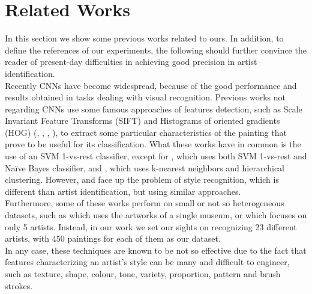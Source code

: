 \documentclass{article}
\begin{document}
\section{Related Works}\label{relwor}

In this section we show some previous works related to ours. In addition, to define the references of our experiments, the following should further convince the reader of present-day difficulties in achieving good precision in artist identification.\\
Recently CNNs have become widespread, because of the good performance and results obtained in tasks dealing with visual recognition.
Previous works not regarding CNNs use some famous approaches of features detection, such as Scale Invariant Feature Transforms (SIFT) and Histograms of oriented gradients (HOG) (\cite{Saleh2015}, \cite{mensink2014}, \cite{lombardi05}, \cite{jou2011}), to extract some particular characteristics of the painting that prove to be useful for its classification. What these works have in common is the use of an SVM 1-vs-rest classifier, except for \cite{jou2011}, which uses both SVM 1-vs-rest and Naïve Bayes classifier, and \cite{lombardi05}, which uses k-nearest neighbors and hierarchical clustering. However, \cite{lombardi05} and \cite{jou2011} face up the problem of style recognition, which is different than artist identification, but using similar approaches.\\
Furthermore, some of these works perform on small or not so heterogeneous datasets, such as \cite{mensink2014} which uses the artworks of a single museum, or \cite{jou2011} which focuses on only 5 artists. Instead, in our work we set our sights on recognizing 23 different artists, with 450 paintings for each of them as our dataset. \\
In any case, these techniques are known to be not so effective due to the fact that features characterizing an artist's style can be many and difficult to engineer, such as texture, shape, colour, tone, variety, proportion, pattern and brush strokes.\\
\end{document}
